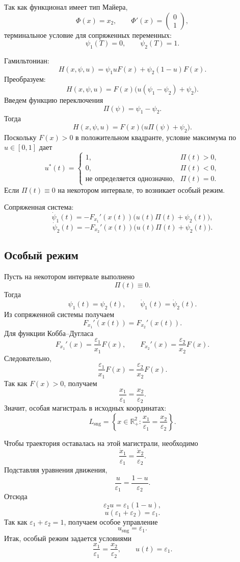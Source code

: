 \documentclass[12pt,a4paper]{article}
\newcommand{\R}{\mathbb{R}}
\newcommand{\eps}{\varepsilon}
\newcommand{\sng}{\mathrm{sng}}
\begin{document}
Так как функционал имеет тип Майера,
\[
    \Phi(x)=x_2,
    \qquad
    \Phi'(x)=
    \begin{pmatrix}
        0\\1
    \end{pmatrix},
\]
терминальное условие для сопряженных переменных:
\[
    \psi_1(T)=0,
    \qquad
    \psi_2(T)=1.
\]

Гамильтониан:
\[
    H(x,\psi,u)=\psi_1uF(x)+\psi_2(1-u)F(x).
\]
Преобразуем:
\[
    H(x,\psi,u)=F(x)\bigl(u(\psi_1-\psi_2)+\psi_2\bigr).
\]
Введем функцию переключения
\[
    \Pi(\psi)=\psi_1-\psi_2.
\]
Тогда
\[
    H(x,\psi,u)=F(x)\bigl(u\Pi(\psi)+\psi_2\bigr).
\]
Поскольку \(F(x)>0\) в положительном квадранте, условие максимума по \(u\in[0,1]\) дает
\[
    u^*(t)=
    \begin{cases}
        1, & \Pi(t)>0,\\
        0, & \Pi(t)<0,\\
        \text{не определяется однозначно}, & \Pi(t)=0.
    \end{cases}
\]
Если \(\Pi(t)\equiv0\) на некотором интервале, то возникает особый режим.

Сопряженная система:
\[
    \dot\psi_1(t)=-F_{x_1}'(x(t))\bigl(u(t)\Pi(t)+\psi_2(t)\bigr),
\]
\[
    \dot\psi_2(t)=-F_{x_2}'(x(t))\bigl(u(t)\Pi(t)+\psi_2(t)\bigr).
\]

\subsection{Особый режим}

Пусть на некотором интервале выполнено
\[
    \Pi(t)\equiv0.
\]
Тогда
\[
    \psi_1(t)=\psi_2(t),
    \qquad
    \dot\psi_1(t)=\dot\psi_2(t).
\]
Из сопряженной системы получаем
\[
    F_{x_1}'(x(t))=F_{x_2}'(x(t)).
\]
Для функции Кобба--Дугласа
\[
    F_{x_1}'(x)=\frac{\eps_1}{x_1}F(x),
    \qquad
    F_{x_2}'(x)=\frac{\eps_2}{x_2}F(x).
\]
Следовательно,
\[
    \frac{\eps_1}{x_1}F(x)=\frac{\eps_2}{x_2}F(x).
\]
Так как \(F(x)>0\), получаем
\[
    \frac{x_1}{\eps_1}=\frac{x_2}{\eps_2}.
\]
Значит, особая магистраль в исходных координатах:
\[
    L_{\sng}=\left\{x\in\R^2_+:
    \frac{x_1}{\eps_1}=\frac{x_2}{\eps_2}\right\}.
\]

Чтобы траектория оставалась на этой магистрали, необходимо
\[
    \frac{\dot x_1}{\eps_1}=\frac{\dot x_2}{\eps_2}.
\]
Подставляя уравнения движения,
\[
    \frac{u}{\eps_1}=\frac{1-u}{\eps_2}.
\]
Отсюда
\[
    \eps_2u=\eps_1(1-u),
\]
\[
    u(\eps_1+\eps_2)=\eps_1.
\]
Так как \(\eps_1+\eps_2=1\), получаем особое управление
\[
    u_{\sng}=\eps_1.
\]
Итак, особый режим задается условиями
\[
    \frac{x_1}{\eps_1}=\frac{x_2}{\eps_2},
    \qquad
    u(t)=\eps_1.
\]
\end{document}
